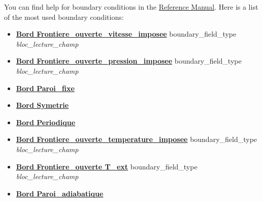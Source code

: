 You can find help for boundary conditions in the \href{\REFERENCEMANUAL\#condlimbase}{\trustref Reference Manual}.
Here is a list of the most used boundary conditions:
{\small{
\begin{itemize}
\item \href{\REFERENCEMANUAL\#frontiereouvertevitesseimposee}{\textbf{Bord Frontiere\_ouverte\_vitesse\_imposee}}    boundary\_field\_type \textit{bloc\_lecture\_champ}
\item \href{\REFERENCEMANUAL\#frontiereouvertepressionimposee}{\textbf{Bord Frontiere\_ouverte\_pression\_imposee}}   boundary\_field\_type \textit{bloc\_lecture\_champ}
\item \href{\REFERENCEMANUAL\#paroifixe}{\textbf{Bord Paroi\_fixe}}
\item \href{\REFERENCEMANUAL\#symetrie}{\textbf{Bord Symetrie}}
\item \href{\REFERENCEMANUAL\#periodic}{\textbf{Bord Periodique}}
\item \href{\REFERENCEMANUAL\#frontiereouvertetemperatureimposee}{\textbf{Bord Frontiere\_ouverte\_temperature\_imposee}}                        boundary\_field\_type \textit{bloc\_lecture\_champ}
\item \href{\REFERENCEMANUAL\#frontiereouverte}{\textbf{Bord Frontiere\_ouverte T\_ext}}                       boundary\_field\_type \textit{bloc\_lecture\_champ}
\item \href{\REFERENCEMANUAL\#paroiadiabatique}{\textbf{Bord Paroi\_adiabatique}}

\end{itemize}}}
